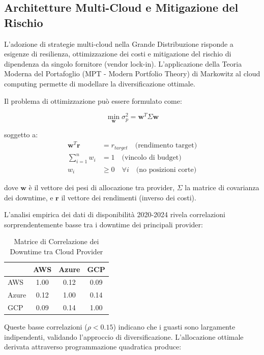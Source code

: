 \subsection{Architetture Multi-Cloud e Mitigazione del Rischio}

L'adozione di strategie multi-cloud nella Grande Distribuzione risponde a esigenze di resilienza, ottimizzazione dei costi e mitigazione del rischio di dipendenza da singolo fornitore (vendor lock-in). L'applicazione della Teoria Moderna del Portafoglio (MPT - Modern Portfolio Theory) di Markowitz\autocite{Tang2024portfolio} al cloud computing permette di modellare la diversificazione ottimale.

Il problema di ottimizzazione può essere formulato come:

\begin{equation}
\min_{\mathbf{w}} \sigma^2_p = \mathbf{w}^T \Sigma \mathbf{w}
\end{equation}

soggetto a:
\begin{align}
\mathbf{w}^T \mathbf{r} &= r_{target} \quad \text{(rendimento target)} \\
\sum_{i=1}^{n} w_i &= 1 \quad \text{(vincolo di budget)} \\
w_i &\geq 0 \quad \forall i \quad \text{(no posizioni corte)}
\end{align}

dove $\mathbf{w}$ è il vettore dei pesi di allocazione tra provider, $\Sigma$ la matrice di covarianza dei downtime, e $\mathbf{r}$ il vettore dei rendimenti (inverso dei costi).

L'analisi empirica dei dati di disponibilità 2020-2024\autocite{Uptime2024} rivela correlazioni sorprendentemente basse tra i downtime dei principali provider:

\begin{table}[htbp]
\centering
\caption{Matrice di Correlazione dei Downtime tra Cloud Provider}
\label{tab:cloud_correlation}
\begin{tabular}{lccc}
\toprule
& AWS & Azure & GCP \\
\midrule
AWS & 1.00 & 0.12 & 0.09 \\
Azure & 0.12 & 1.00 & 0.14 \\
GCP & 0.09 & 0.14 & 1.00 \\
\bottomrule
\end{tabular}
\end{table}

Queste basse correlazioni ($\rho < 0.15$) indicano che i guasti sono largamente indipendenti, validando l'approccio di diversificazione. L'allocazione ottimale derivata attraverso programmazione quadratica produce:

